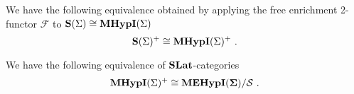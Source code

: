 \begin{lemma}
\label{lemma:2functor_equiv}
We have the following equivalence obtained by applying the free enrichment 2-functor $\mathcal{F}$ to $\mathbf{S}(\Sigma) \cong \textbf{MHypI}(\Sigma)$
\[
\mathbf{S}(\Sigma)^{+} \cong \textbf{MHypI}(\Sigma)^{+}~.
\]
\end{lemma}




\begin{lemma}
\label{lemma:cospans_plus_equiv}
We have the following equivalence of $\mathbf{SLat}$-categories
\vspace{-2mm}
\[
\MdaCospans^{+} \cong \MdaEcospans/\mathcal{S}~.
\vspace{-1mm}
\]
\end{lemma}

